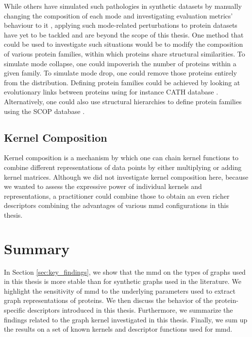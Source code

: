 While others have simulated such pathologies in synthetic datasets by manually
changing the composition of each mode and investigating evaluation metrics'
behaviour to it \citep{thompson2022evaluation}, applying such mode-related
perturbations to protein datasets have yet to be tackled and are beyond the scope
of this thesis. One method that could be used to investigate such situations
would be to modify the composition of various protein families, within which proteins
share structural similarities. To simulate mode collapse, one could impoverish the number of proteins
within a given family. To simulate mode drop, one could remove those proteins entirely from
the distribution. Defining protein families could be achieved by looking at
evolutionary links between proteins using for instance CATH database
\citep{orengo1997cath}. Alternatively, one could also use structural hierarchies
to define protein families using the SCOP database \citep{murzin1995scop}.

\subsection{Kernel Composition}

Kernel composition is a mechanism by which one can chain kernel functions to
combine different representations of data points by either multiplying or adding
kernel matrices. Although we did not investigate kernel composition here,
because we wanted to assess the expressive power of individual kernels and
representations, a practitioner could combine those to obtain an even richer
descriptors combining the advantages of various \acrshort{mmd} configurations in this
thesis.

\section{Summary}


In Section \ref{sec:key_findings}, we show that the \acrshort{mmd} on the types of graphs used in this
thesis is more stable than for synthetic graphs used in the literature. We
highlight the sensitivity of \acrshort{mmd} to the underlying parameters used to extract
graph representations of proteins. We then discuss the behavior of the
protein-specific descriptors introduced in this thesis. Furthermore, we
summarize the findings related to the graph kernel investigated in this thesis.
Finally, we sum up the results on a set of known kernels and descriptor
functions used for \acrshort{mmd}.


